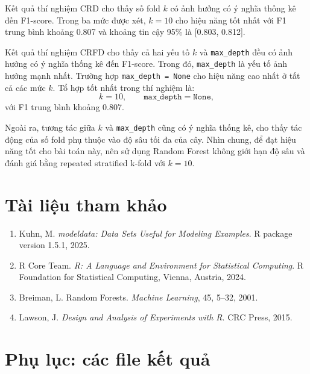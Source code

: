\documentclass[12pt,a4paper]{article}
\begin{document}
Kết quả thí nghiệm CRD cho thấy số fold $k$ có ảnh hưởng có ý nghĩa thống kê đến F1-score. Trong ba mức được xét, $k=10$ cho hiệu năng tốt nhất với F1 trung bình khoảng 0.807 và khoảng tin cậy 95\% là [0.803, 0.812].

Kết quả thí nghiệm CRFD cho thấy cả hai yếu tố $k$ và \texttt{max\_depth} đều có ảnh hưởng có ý nghĩa thống kê đến F1-score. Trong đó, \texttt{max\_depth} là yếu tố ảnh hưởng mạnh nhất. Trường hợp \texttt{max\_depth = None} cho hiệu năng cao nhất ở tất cả các mức $k$. Tổ hợp tốt nhất trong thí nghiệm là:
\[
k = 10, \qquad \texttt{max\_depth} = \texttt{None},
\]
với F1 trung bình khoảng 0.807.

Ngoài ra, tương tác giữa $k$ và \texttt{max\_depth} cũng có ý nghĩa thống kê, cho thấy tác động của số fold phụ thuộc vào độ sâu tối đa của cây. Nhìn chung, để đạt hiệu năng tốt cho bài toán này, nên sử dụng Random Forest không giới hạn độ sâu và đánh giá bằng repeated stratified k-fold với $k=10$.

\section*{Tài liệu tham khảo}

\begin{enumerate}
    \item Kuhn, M. \textit{modeldata: Data Sets Useful for Modeling Examples}. R package version 1.5.1, 2025.
    \item R Core Team. \textit{R: A Language and Environment for Statistical Computing}. R Foundation for Statistical Computing, Vienna, Austria, 2024.
    \item Breiman, L. Random Forests. \textit{Machine Learning}, 45, 5--32, 2001.
    \item Lawson, J. \textit{Design and Analysis of Experiments with R}. CRC Press, 2015.
\end{enumerate}

\appendix
\section{Phụ lục: các file kết quả}
\end{document}
